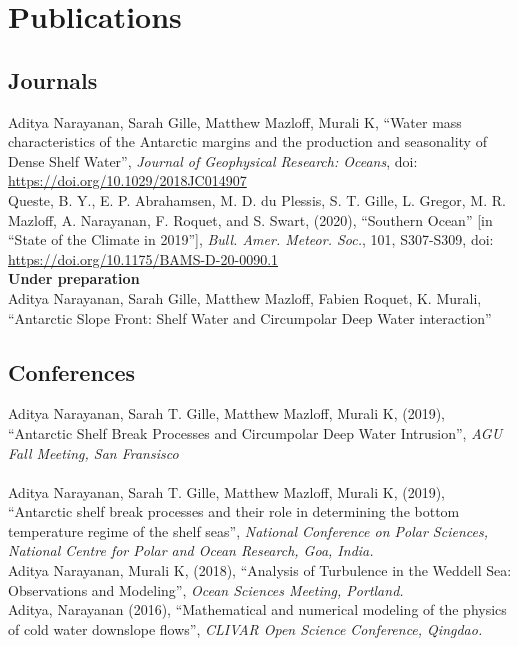 \documentclass[12pt, a4paper]{article}
\newcommand{\years}[1]{\marginnote{\small #1}}
\begin{document}
\section*{Publications}

\subsection*{\bf Journals}
\years{2019}Aditya Narayanan, Sarah Gille, Matthew Mazloff, Murali K, ``Water mass characteristics of the Antarctic margins and the production and seasonality of Dense Shelf Water'', \emph{Journal of Geophysical Research: Oceans}, doi: \url{https://doi.org/10.1029/2018JC014907}\\
\years{2020} Queste, B. Y., E. P. Abrahamsen, M. D. du Plessis, S. T. Gille, L. Gregor, M. R. Mazloff, A. Narayanan, F. Roquet, and S. Swart, (2020), ``Southern Ocean'' [in ``State of the Climate in 2019''], \emph{Bull. Amer. Meteor. Soc.}, 101, S307-S309, doi: \url{https://doi.org/10.1175/BAMS-D-20-0090.1}\\

{\bf Under preparation}\\

\years{}Aditya Narayanan, Sarah Gille, Matthew Mazloff, Fabien Roquet, K. Murali, ``Antarctic Slope Front: Shelf Water and Circumpolar Deep Water interaction''\\


\subsection*{\bf Conferences}
\years{2019}Aditya Narayanan, Sarah T. Gille, Matthew Mazloff, Murali K, (2019), ``Antarctic Shelf Break Processes and Circumpolar Deep Water Intrusion'', \emph{AGU Fall Meeting, San Fransisco}\\
\\
\years{2019}Aditya Narayanan, Sarah T. Gille, Matthew Mazloff, Murali K, (2019), ``Antarctic shelf break processes and their role in determining the bottom temperature regime of the shelf seas'', \emph{National Conference on Polar Sciences, National Centre for Polar and Ocean Research, Goa, India.}\\

\years{2018}Aditya Narayanan, Murali K, (2018), ``Analysis of Turbulence in the Weddell Sea: Observations and Modeling'', \emph{Ocean Sciences Meeting, Portland.}\\

\years{2016}Aditya, Narayanan (2016), ``Mathematical and numerical modeling of the physics of cold water downslope flows'', \emph{CLIVAR Open Science Conference, Qingdao.}
\end{document}
